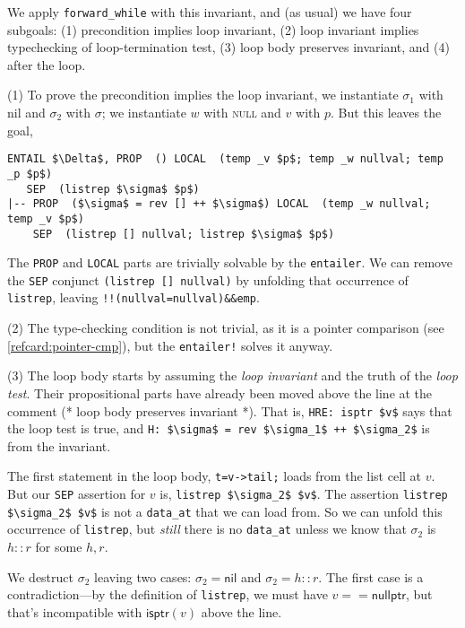 \documentclass[12pt,fleqn,openany,oneside,showtrims]{memoir}
\begin{document}
We apply \lstinline{forward_while} with this invariant,
and (as usual) we have four subgoals:
(1) precondition implies loop invariant, (2) loop invariant
implies typechecking of loop-termination test,
(3) loop body preserves invariant, and (4) after the loop.

(1) To prove the precondition implies the loop invariant,
we instantiate $\sigma_1$ with nil
and $\sigma_2$ with $\sigma$;
we instantiate $w$ with \textsc{null} and $v$ with $p$.
But this leaves the goal,
\begin{lstlisting}
ENTAIL $\Delta$, PROP  () LOCAL  (temp _v $p$; temp _w nullval; temp _p $p$)
   SEP  (listrep $\sigma$ $p$)
|-- PROP  ($\sigma$ = rev [] ++ $\sigma$) LOCAL  (temp _w nullval; temp _v $p$)
    SEP  (listrep [] nullval; listrep $\sigma$ $p$)
\end{lstlisting}
\vspace{-3ex}
The \lstinline{PROP} and \lstinline{LOCAL} parts are trivially
solvable by the \lstinline{entailer}.
We can remove the \lstinline{SEP} conjunct
\lstinline{(listrep [] nullval)}
by unfolding that occurrence of \lstinline{listrep},
leaving \lstinline{!!(nullval=nullval)&&emp}.

\vspace{-2ex}
(2) The type-checking condition is not trivial, as it is a pointer
comparison (see \autoref{refcard:pointer-cmp}), but
the \lstinline{entailer!} solves it anyway.

(3) The loop body starts by assuming the \emph{loop invariant}
and the truth of the \emph{loop test}.  Their propositional parts have already
been moved above the line at the comment
\textsf{(* loop body preserves invariant *)}.
That is, \lstinline{HRE: isptr $v$} says that the loop test is true,
and \lstinline{H: $\sigma$ = rev $\sigma_1$ ++ $\sigma_2$} is from the invariant.

The first statement in the loop body, \lstinline{t=v->tail;}
loads from the list cell at $v$.  But our \lstinline{SEP}
assertion for $v$ is,
\lstinline{listrep $\sigma_2$ $v$}.
The assertion
\lstinline{listrep $\sigma_2$ $v$}
is not a \lstinline{data_at} that we can load from.
So we can unfold this occurrence of \lstinline{listrep},
but \emph{still} there is no \lstinline{data_at}
unless we know that $\sigma_2$ is $h::r$ for some $h,r$.

We destruct $\sigma_2$ leaving two cases:
$\sigma_2=\mathsf{nil}$ and
$\sigma_2=h::r$.  The first case is a contradiction---by the
definition of \lstinline{listrep}, we must have $v==\mathsf{nullptr}$,
but that's incompatible with $\mathsf{isptr}(v)$ above the line.
\end{document}
